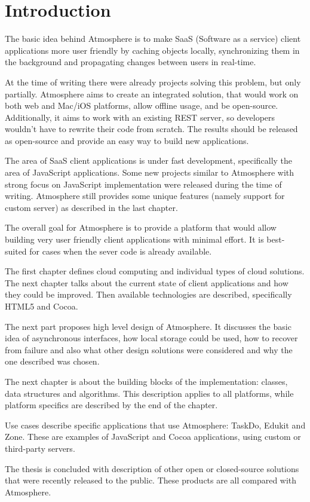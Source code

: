 \setcounter{page}{1}
\setcounter{equation}{0}
\setcounter{figure}{0}
\setcounter{table}{0}

\section*{Introduction}

The basic idea behind Atmosphere is to make SaaS (Software as a service) client applications more user friendly by caching objects locally, synchronizing them in the background and propagating changes between users in real-time.

At the time of writing there were already projects solving this problem, but only partially. Atmosphere aims to create an integrated solution, that would work on both web and Mac/iOS platforms, allow offline usage, and be open-source. Additionally, it aims to work with an existing REST server, so developers wouldn't have to rewrite their code from scratch. The results should be released as open-source and provide an easy way to build new applications.

The area of SaaS client applications is under fast development, specifically the area of JavaScript applications. Some new projects similar to Atmosphere with strong focus on JavaScript implementation were released during the time of writing. Atmosphere still provides some unique features (namely support for custom server) as described in the last chapter.

The overall goal for Atmosphere is to provide a platform that would allow building very user friendly client applications with minimal effort. It is best-suited for cases when the sever code is already available.

The first chapter defines cloud computing and individual types of cloud solutions. The next chapter talks about the current state of client applications and how they could be improved. Then available technologies are described, specifically HTML5 and Cocoa.

The next part proposes high level design of Atmosphere. It discusses the basic idea of asynchronous interfaces, how local storage could be used, how to recover from failure and also what other design solutions were considered and why the one described was chosen.

The next chapter is about the building blocks of the implementation: classes, data structures and algorithms. This description applies to all platforms, while platform specifics are described by the end of the chapter.

Use cases describe specific applications that use Atmosphere: TaskDo, Edukit and Zone. These are examples of JavaScript and Cocoa applications, using custom or third-party servers.

The thesis is concluded with description of other open or closed-source solutions that were recently released to the public. These products are all compared with Atmosphere.